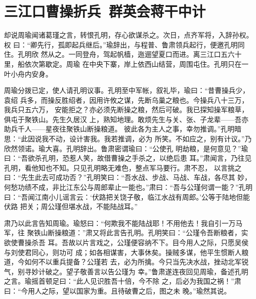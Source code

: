 \chapter{三江口曹操折兵~群英会蒋干中计}

却说周瑜闻诸葛瑾之言，转恨孔明，存心欲谋杀之。次日，点齐军将，入辞孙权。权
曰：“卿先行，孤即起兵继后。”瑜辞出，与程普、鲁肃领兵起行，便邀孔明同住。孔明欣
然从之。一同登舟，驾起帆樯，迤逦望夏口而进。离三江口五六十里，船依次第歇定。周瑜
在中央下寨，岸上依西山结营，周围屯住。孔明只在一叶小舟内安身。

周瑜分拨已定，使人请孔明议事。孔明至中军帐，叙礼毕，瑜曰：“昔曹操兵少，袁绍
兵多，而操反胜绍者，因用许攸之谋，先断乌巢之粮也。今操兵八十三万，我兵只五六万，
安能拒之？亦必须先断操之粮，然后可破。我已探知操军粮草，俱屯于聚铁山。先生久居汉
上，熟知地理。敢烦先生与关、张、子龙辈——吾亦助兵千人——星夜往聚铁山断操粮道。
彼此各为主人之事，幸勿推调。”孔明暗思：“此因说我不动，设计害我。我若推调，必为
所笑。不如应之，别有计议。”乃欣然领诺。瑜大喜。孔明辞出。鲁肃密谓瑜曰：“公使孔
明劫粮，是何意见？”瑜曰：“吾欲杀孔明，恐惹人笑，故借曹操之手杀之，以绝后患
耳。”肃闻言，乃往见孔明，看他知也不知。只见孔明略无难色，整点军马要行。肃不忍，
以言挑之曰：“先生此去可成功否？”孔明笑曰：“吾水战、步战、马战、车战，各尽其
妙，何愁功绩不成，非比江东公与周郎辈止一能也。”肃曰：“吾与公瑾何谓一能？”孔明
曰：“吾闻江南小儿谣言云：‘伏路把关饶子敬，临江水战有周郎。’公等于陆地但能伏路
把关；周公瑾但堪水战，不能陆战耳。”

肃乃以此言告知周瑜。瑜怒曰：“何欺我不能陆战耶！不用他去！我自引一万马军，往
聚铁山断操粮道：”肃又将此言告孔明。孔明笑曰：“公瑾令吾断粮者，实欲使曹操杀吾
耳。吾故以片言戏之，公瑾便容纳不下。目今用人之际，只愿吴侯与刘使君同心，则功可
成；如各相谋害，大事休矣。操贼多谋，他平生惯断人粮道，今如何不以重兵提备？公瑾若
去，必为所擒。今只当先决水战，挫动北军锐气，别寻妙计破之。望子敬善言以告公瑾为
幸。”鲁肃遂连夜回见周瑜，备述孔明之言。瑜摇首顿足曰：“此人见识胜吾十倍，今不除
之，后必为我国之祸！”肃曰：“今用人之际，望以国家为重。且待破曹之后，图之未
晚。”瑜然其说。

